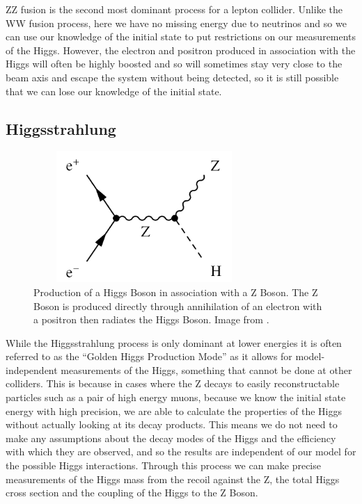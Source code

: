 ZZ fusion is the second most dominant process for a lepton collider. Unlike the WW fusion process, here we have no missing energy due to neutrinos and so we can use our knowledge of the initial state to put restrictions on our measurements of the Higgs. However, the electron and positron produced in association with the Higgs will often be highly boosted and so will sometimes stay very close to the beam axis and escape the system without being detected, so it is still possible that we can lose our knowledge of the initial state. 
\subsection{Higgsstrahlung}
\begin{figure}[h]
  \centering
  \includegraphics[width=0.75\textwidth,height=5cm,keepaspectratio]{fig/HiggsStrahlung}
  \caption[Higgsstrahlung Process]{Production of a Higgs Boson in association with a Z Boson. The Z Boson is produced directly through annihilation of an  electron with a positron then radiates the Higgs Boson. Image from \cite{Simon:2014aqa}.}
  \label{Fig:Higgsstrahlung}
\end{figure}

While the Higgsstrahlung process is only dominant at lower energies it is often referred to as the “Golden Higgs Production Mode” as it allows for model-independent measurements of the Higgs, something that cannot be done at other colliders. This is because in cases where the Z decays to easily reconstructable particles such as a pair of high energy muons, because we know the initial state energy with high precision, we are able to calculate the properties of the Higgs without actually looking at its decay products. This means we do not need to make any assumptions about the decay modes of the Higgs and the efficiency with which they are observed, and so the results are independent of our model for the possible Higgs interactions. Through this process we can make precise measurements of the Higgs mass from the recoil against the Z, the total Higgs cross section and the coupling of the Higgs to the Z Boson.

